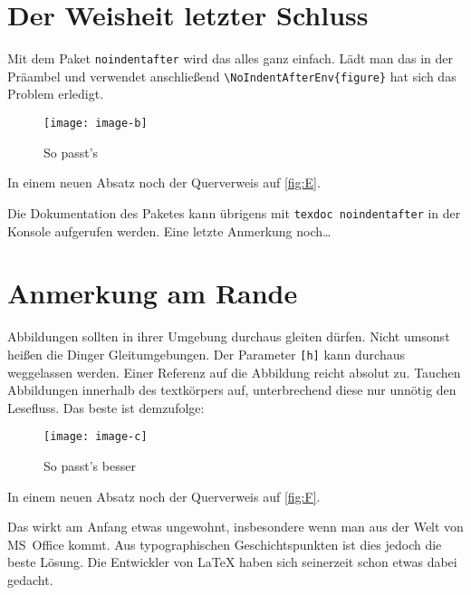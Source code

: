 \documentclass[english,ngerman]{tudscrartcl}
\begin{document}
\section{Der Weisheit letzter Schluss}
Mit dem Paket \verb|noindentafter| wird das alles ganz einfach. Lädt man das in 
der Präambel und verwendet anschließend \verb|\NoIndentAfterEnv{figure}| hat 
sich das Problem erledigt.
%
\begin{quoting}\univrn\color{cdgrey}
\begin{Tutorial}
\blindtext

\begin{figure}[h]
\centering
\texttt{[image: image-b]}
\caption{So passt's}
\label{fig:E}
\end{figure}

\blindtext

In einem neuen Absatz noch der Querverweis auf \autoref{fig:E}.
\end{Tutorial}
\end{quoting}
%
Die Dokumentation des Paketes kann übrigens mit \verb|texdoc noindentafter| in 
der Konsole aufgerufen werden. Eine letzte Anmerkung noch\dots

\clearpage
\section{Anmerkung am Rande}
Abbildungen sollten in ihrer Umgebung durchaus gleiten dürfen. Nicht umsonst 
heißen die Dinger Gleitumgebungen. Der Parameter \verb|[h]| kann durchaus 
weggelassen werden. Einer Referenz auf die Abbildung reicht absolut zu. Tauchen 
Abbildungen innerhalb des textkörpers auf, unterbrechend diese nur unnötig den 
Lesefluss. Das beste ist demzufolge:
\let\NoIndentAfterThis\relax
%
\begin{quoting}\univrn\color{cdgrey}
\begin{Tutorial}
\blindtext

\begin{figure}
\centering
\texttt{[image: image-c]}
\caption{So passt's besser}
\label{fig:F}
\end{figure}

In einem neuen Absatz noch der Querverweis auf \autoref{fig:F}.
\blindtext
\end{Tutorial}
\end{quoting}
%
\enlargethispage{\baselineskip}
Das wirkt am Anfang etwas ungewohnt, insbesondere wenn man aus der Welt von 
MS~Office kommt. Aus typographischen Geschichtspunkten ist dies jedoch die 
beste Lösung. Die Entwickler von \LaTeX{} haben sich seinerzeit schon etwas 
dabei gedacht.
\end{document}
